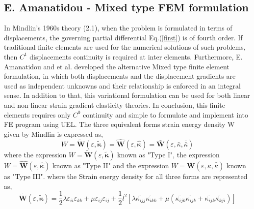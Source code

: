 \documentclass[12pt]{article}
\begin{document}
\subsection{E. Amanatidou - Mixed type FEM formulation}
In Mindlin's 1960s theory (2.1), when the problem is formulated in terms of displacements, the governing partial differential Eq.(\ref{first}) is of fourth order. If traditional finite elements are used for the numerical solutions of such problems, then $C^1$ displacements continuity is required at inter elements.
\newline
\newline
Furthermore, E. Amanatidou \cite{amanatidou2002mixed} and et al. developed the alternative Mixed type finite element formulation, in which both displacements and the displacement gradients are used as independent unknowns and their relationship is enforced in an integral sense. In addition to that, this variational formulation can be used for both linear and non-linear strain gradient elasticity theories. In conclusion, this finite elements requires only $C^0$ continuity and simple to formulate and implement into FE program using UEL.   
\newline
\newline
The three equivalent forms strain energy density W given by Mindlin is expressed as,
\begin{equation}
W = \tilde{\mathbf{W}}(\varepsilon,\tilde{\mathbf{\kappa}}) = \hat{\mathbf{W}}(\varepsilon,\hat{\mathbf{\kappa}}) = \bar{\mathbf{W}}(\varepsilon,\bar{\kappa},\bar{\bar \kappa})
\end{equation}
\newline
where the expression $W = \tilde{\mathbf{W}}(\varepsilon,\tilde{\mathbf{\kappa}})$ known as "Type I", the expression $W =\hat{\mathbf{W}}(\varepsilon,\hat{\mathbf{\kappa}}) $ known as "Type II" and the expression $W = \bar{\mathbf{W}}(\varepsilon,\bar{\kappa},\bar{\bar \kappa}) $ known as "Type III".
\newline
\newline
where the Strain energy density for all three forms are represented as,
\newline
\newline
\begin{equation}\label{eleven}
\tilde{\mathbf{W}}(\varepsilon,\tilde{\mathbf{\kappa}}) = \dfrac{1}{2}\lambda\varepsilon_{ii}\varepsilon_{kk} + \mu\varepsilon_{ij}\varepsilon_{ij}+\frac{1}{2}l^2[\lambda\tilde{\kappa_{ijj}}\tilde{\kappa_{ikk}} + \mu(\tilde{\kappa_{ijk}}\tilde{\kappa_{ijk}}+\tilde{\kappa_{ijk}}\tilde{\kappa_{kji}})]
\end{equation}
\end{document}
